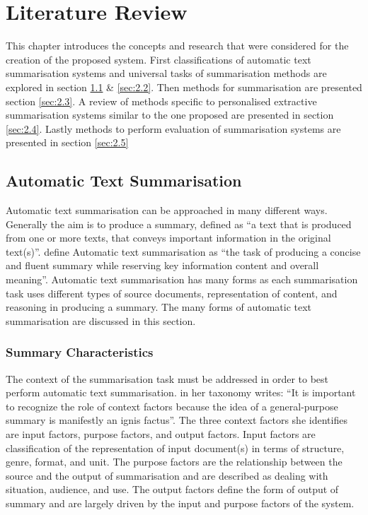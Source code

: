 \chapter{Literature Review}
\label{chp:2}

\justify

This chapter introduces the concepts and research that were considered for the creation of the proposed system. First classifications of automatic text summarisation systems and universal tasks of summarisation methods are explored in section \ref{sec:2.1} \& \ref{sec:2.2}. Then methods for summarisation are presented section \ref{sec:2.3}. A review of methods specific to personalised extractive summarisation systems similar to the one proposed are presented in section \ref{sec:2.4}. Lastly methods to perform evaluation of summarisation systems are presented in section \ref{sec:2.5}

\section{Automatic Text Summarisation}
\label{sec:2.1}

Automatic text summarisation can be approached in many different ways. Generally the aim is to produce a summary, defined as “a text that is produced from one or more texts, that conveys important information in the original text(s)”\citep{radev2002introduction}. \citet{allahyari2017text} define Automatic text summarisation as “the task of producing a concise and fluent summary while reserving key information content and overall meaning”. Automatic text summarisation has many forms as each summarisation task uses different types of source documents, representation of content, and reasoning in producing a summary. The many forms of automatic text summarisation are discussed in this section.

\subsection{Summary Characteristics}
\label{subsec:2.1.1}

The context of the summarisation task must be addressed in order to best perform automatic text summarisation. \citet{jones1999automatic} in her taxonomy writes: “It is important to recognize the role of context factors because the idea of a general-purpose summary is manifestly an ignis factus”. The three context factors she identifies are input factors, purpose factors, and output factors. Input factors are classification of the representation of input document(s) in terms of structure, genre, format, and unit. The purpose factors are the relationship between the source and the output of summarisation and are described as dealing with situation, audience, and use. The output factors define the form of output of summary and are largely driven by the input and purpose factors of the system.

